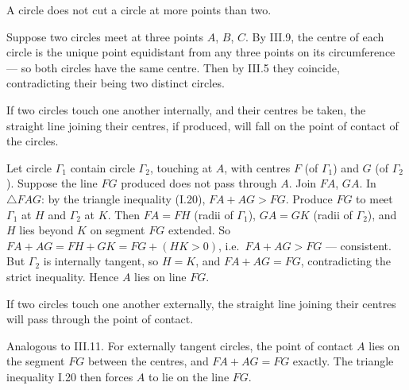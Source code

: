 \begin{claim}
\label{prop:III.10}
A circle does not cut a circle at more points than two.
\end{claim}
\begin{evidence}
\label{ev:III.10}
Suppose two circles meet at three points $A$, $B$, $C$.  By III.9,
the centre of each circle is the unique point equidistant from any
three points on its circumference --- so both circles have the same
centre.  Then by III.5 they coincide, contradicting their being two
distinct circles.
\end{evidence}

\begin{claim}
\label{prop:III.11}
If two circles touch one another internally, and their centres be
taken, the straight line joining their centres, if produced, will
fall on the point of contact of the circles.
\end{claim}
\begin{evidence}
\label{ev:III.11}
Let circle $\Gamma_1$ contain circle $\Gamma_2$, touching at $A$,
with centres $F$ (of $\Gamma_1$) and $G$ (of $\Gamma_2$).  Suppose
the line $FG$ produced does not pass through $A$.  Join $FA$, $GA$.
In $\triangle FAG$: by the triangle inequality (I.20), $FA + AG >
FG$.  Produce $FG$ to meet $\Gamma_1$ at $H$ and $\Gamma_2$ at $K$.
Then $FA = FH$ (radii of $\Gamma_1$), $GA = GK$ (radii of
$\Gamma_2$), and $H$ lies beyond $K$ on segment $FG$ extended.  So
$FA + AG = FH + GK = FG + (HK > 0)$, i.e.\ $FA + AG > FG$ ---
consistent.  But $\Gamma_2$ is internally tangent, so $H = K$, and
$FA + AG = FG$, contradicting the strict inequality.  Hence $A$
lies on line $FG$.
\end{evidence}

\begin{claim}
\label{prop:III.12}
If two circles touch one another externally, the straight line
joining their centres will pass through the point of contact.
\end{claim}
\begin{evidence}
\label{ev:III.12}
Analogous to III.11.  For externally tangent circles, the point of
contact $A$ lies on the segment $FG$ between the centres, and
$FA + AG = FG$ exactly.  The triangle inequality I.20 then forces
$A$ to lie on the line $FG$.
\end{evidence}

